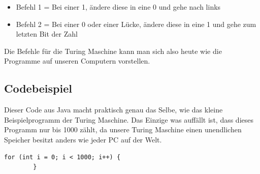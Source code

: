 \begin{itemize}
\item Befehl 1 = Bei einer 1, ändere diese in eine 0 und gehe nach links 
\item Befehl 2 = Bei einer 0 oder einer Lücke, ändere diese in eine 1 und gehe zum letzten Bit der Zahl 
\end{itemize}

Die Befehle für die Turing Maschine kann man sich also heute wie die Programme auf unseren Computern vorstellen.

\subsection{Codebeispiel}
Dieser Code aus Java macht praktisch genau das Selbe, wie das kleine Beispielprogramm der Turing Maschine. Das Einzige was auffällt ist, dass dieses Programm nur bis 1000 zählt, da unsere Turing Maschine einen unendlichen Speicher besitzt anders wie jeder PC auf der Welt.

\begin{verbatim}
for (int i = 0; i < 1000; i++) {
		}			
\end{verbatim}